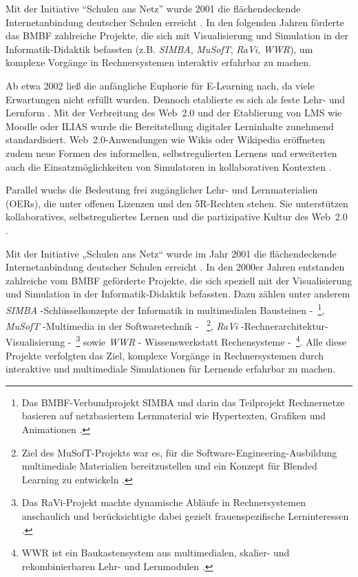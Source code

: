 Mit der Initiative \enquote{Schulen ans Netz} wurde 2001 die flächendeckende Internetanbindung deutscher Schulen erreicht \parencite{schulen_ans_netz_ev_schulen_nodate,kopcke_internet_2016}. In den folgenden Jahren förderte das \ac{BMBF} zahlreiche Projekte, die sich mit Visualisierung und Simulation in der Informatik-Didaktik befassten (z.B. \textit{SIMBA}, \textit{MuSofT}, \textit{RaVi}, \textit{WWR}), um komplexe Vorgänge in Rechnersystemen interaktiv erfahrbar zu machen. 

Ab etwa 2002 ließ die anfängliche Euphorie für E-Learning nach, da viele Erwartungen nicht erfüllt wurden. Dennoch etablierte es sich als feste Lehr- und Lernform \parencite[S.~14]{niegemann_kompendium_2008}. Mit der Verbreitung des Web~2.0 und der Etablierung von \ac{LMS} wie Moodle oder ILIAS wurde die Bereitstellung digitaler Lerninhalte zunehmend standardisiert. Web~2.0-Anwendungen wie Wikis oder Wikipedia eröffneten zudem neue Formen des informellen, selbstregulierten Lernens und erweiterten auch die Einsatzmöglichkeiten von Simulatoren in kollaborativen Kontexten \parencite[S.~129f]{gallagher_assessing_2007}. 

Parallel wuchs die Bedeutung frei zugänglicher Lehr- und Lernmaterialien (\acp{OER}), die unter offenen Lizenzen und den 5R-Rechten stehen. Sie unterstützen kollaboratives, selbstreguliertes Lernen und die partizipative Kultur des Web~2.0 \parencites[S.~1]{unesco_guidelines_2011}[S.~194f]{fluhler_open_2024}.


\iffalse
Mit der Initiative „Schulen ans Netz“ \cite{schulen_ans_netz_ev_schulen_nodate} wurde im Jahr 2001 die flächendeckende Internetanbindung deutscher Schulen erreicht \cite{kopcke_internet_2016}. In den 2000er Jahren entstanden zahlreiche vom \ac{BMBF} geförderte Projekte, die sich speziell mit der Visualisierung und Simulation in der Informatik-Didaktik befassten. Dazu zählen unter anderem \textit{SIMBA} -Schlüsselkonzepte der Informatik in multimedialen Bausteinen -~\footnote{Das \ac{BMBF}-Verbundprojekt SIMBA und darin das Teilprojekt Rechnernetze basieren auf netzbasiertem Lernmaterial wie Hypertexten, Grafiken und Animationen \parencite[S.~75]{magenheim_blended_2003}.}, \textit{MuSofT} -Multimedia in der Softwaretechnik -~ \footnote{Ziel des MuSofT-Projekts war es, für die Software-Engineering-Ausbildung multimediale Materialien bereitzustellen und ein Konzept für Blended Learning zu entwickeln \parencite[S.~73]{magenheim_blended_2003}.}, \textit{RaVi} -Rechnerarchitektur-Visualisierung -~\footnote{Das RaVi-Projekt machte dynamische Abläufe in Rechnersystemen anschaulich und berücksichtigte dabei gezielt frauenspezifische Lerninteressen \parencite[S.~20]{marwedel_interaktive_2003}.} sowie \textit{WWR} - Wissenswerkstatt Rechensysteme -~\footnote{WWR ist ein Baukastensystem aus multimedialen, skalier- und rekombinierbaren Lehr- und Lernmodulen \parencite[S.~1]{kornelsen_inhalte_2004}.}. Alle diese Projekte verfolgten das Ziel, komplexe Vorgänge in Rechnersystemen durch interaktive und multimediale Simulationen für Lernende erfahrbar zu machen.

